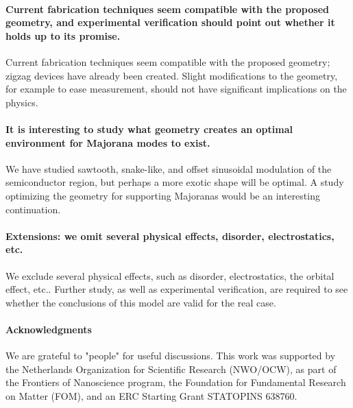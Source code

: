 \documentclass[english, twocolumn, 10pt, aps, superscriptaddress, floatfix, prb, citeautoscript]{revtex4-1}
\renewcommand{\comment}[2]{#2}
\renewcommand{\comment}{\paragraph}
\begin{document}
\comment{Current fabrication techniques seem compatible with the proposed geometry, and experimental verification should point out whether it holds up to its promise.}
Current fabrication techniques seem compatible with the proposed geometry; zigzag devices have already been created.
Slight modifications to the geometry, for example to ease measurement, should not have significant implications on the physics.

\comment{It is interesting to study what geometry creates an optimal environment for Majorana modes to exist.}
We have studied sawtooth, snake-like, and offset sinusoidal modulation of the semiconductor region, but perhaps a more exotic shape will be optimal.
A study optimizing the geometry for supporting Majoranas would be an interesting continuation.

\comment{Extensions: we omit several physical effects, disorder, electrostatics, etc.}
We exclude several physical effects, such as disorder, electrostatics, the orbital effect, etc..
Further study, as well as experimental verification, are required to see whether the conclusions of this model are valid for the real case.

\comment{Acknowledgments}

We are grateful to "people" for useful discussions.
This work was supported by the Netherlands Organization for Scientific Research (NWO/OCW), as part of the Frontiers of Nanoscience program, the Foundation for Fundamental Research on Matter (FOM), and an ERC Starting Grant STATOPINS 638760.



\end{document}
